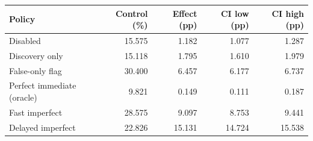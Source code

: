 \begin{tabular}{lrrrr}
\toprule
Policy & Control (\%) & Effect (pp) & CI low (pp) & CI high (pp) \\
\midrule
Disabled & 15.575 & 1.182 & 1.077 & 1.287 \\
Discovery only & 15.118 & 1.795 & 1.610 & 1.979 \\
False-only flag & 30.400 & 6.457 & 6.177 & 6.737 \\
Perfect immediate (oracle) & 9.821 & 0.149 & 0.111 & 0.187 \\
Fast imperfect & 28.575 & 9.097 & 8.753 & 9.441 \\
Delayed imperfect & 22.826 & 15.131 & 14.724 & 15.538 \\
\bottomrule
\end{tabular}
